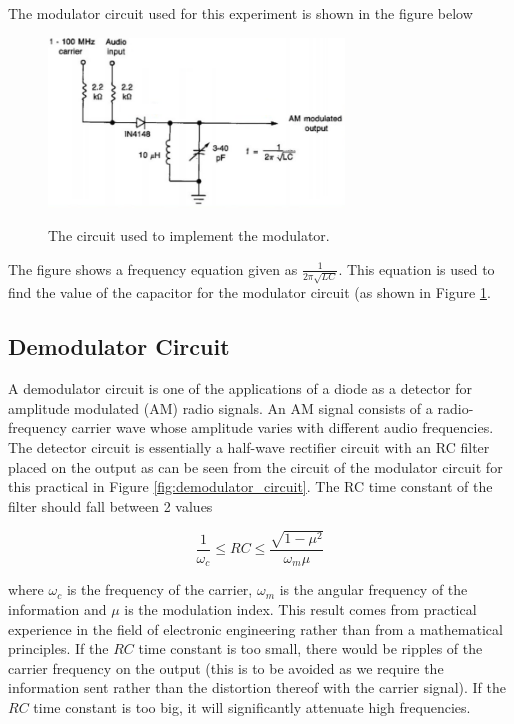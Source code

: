 \documentclass[12pt, a4paper]{article}
\begin{document}
		The modulator circuit used for this experiment is shown in the figure below

		\begin{figure}[H]
			\centering
			\includegraphics[width=0.7\textwidth]{images/modulator_circuit.png}
			\label{fig:modulator_circuit}
			\caption{The circuit used to implement the modulator.}
		\end{figure}

		The figure shows a frequency equation given as $\frac{1}{2\pi\sqrt{LC}}$. This equation is used to find the value of the capacitor for the modulator circuit (as shown in Figure \ref{fig:modulator_circuit}.
	\subsection{Demodulator Circuit}

		A demodulator circuit is one of the applications of a diode as a detector for amplitude modulated (AM) radio signals. An AM signal consists of a radio-frequency carrier wave whose amplitude varies with different audio frequencies. The detector circuit is essentially a half-wave rectifier circuit with an RC filter placed on the output as can be seen from the circuit of the modulator circuit for this practical in Figure \ref{fig:demodulator_circuit}. The RC time constant of the filter should fall between 2 values

		\begin{equation}
			\label{eqn:time_const_demodulator_circuit}
			\frac{1}{\omega_c} \le RC \le \frac{\sqrt{1-\mu^2}}{\omega_m\mu}
		\end{equation}

		where $\omega_c$ is the frequency of the carrier, $\omega_m$ is the angular frequency of the information and $\mu$ is the modulation index. This result comes from practical experience in the field of electronic engineering rather than from a mathematical principles. If the $RC$ time constant is too small, there would be ripples of the carrier frequency on the output (this is to be avoided as we require the information sent rather than the distortion thereof with the carrier signal). If the $RC$ time constant is too big, it will significantly attenuate high frequencies.
\end{document}
